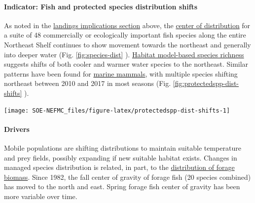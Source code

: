 \documentclass[
  10pt,
]{article}
\let\origfigure\figure
\let\endorigfigure\endfigure
\renewenvironment{figure}[1][2] {
    \expandafter\origfigure\expandafter[H]
} {
    \endorigfigure
}
\begin{document}
\hypertarget{indicator-fish-and-protected-species-distribution-shifts}{%
\paragraph{Indicator: Fish and protected species distribution shifts}\label{indicator-fish-and-protected-species-distribution-shifts}}

As noted in the \protect\hyperlink{implications}{landings implications section} above, the \href{https://noaa-edab.github.io/catalog/species_dist.html}{center of distribution} for a suite of 48 commercially or ecologically important fish species along the entire Northeast Shelf continues to show movement towards the northeast and generally into deeper water (Fig. \ref{fig:species-dist} ). \href{https://noaa-edab.github.io/catalog/habitat_diversity.html}{Habitat model-based species richness} suggests shifts of both cooler and warmer water species to the northeast. Similar patterns have been found for \href{https://noaa-edab.github.io/catalog/HMS_species_distribution.html}{marine mammals}, with multiple species shifting northeast between 2010 and 2017 in most seasons (Fig. \ref{fig:protectedspp-dist-shifts} ).

\begin{figure}

{\centering \texttt{[image: SOE-NEFMC\_files/figure-latex/protectedspp-dist-shifts-1]} 

}

\caption{Direction and magnitude of core habitat shifts, represented by the length of the line of the seasonal weighted centroid for species with more than 70 km difference between 2010 and 2017 (tip of arrow).}\label{fig:protectedspp-dist-shifts}
\end{figure}

\hypertarget{drivers}{%
\paragraph{Drivers}\label{drivers}}

Mobile populations are shifting distributions to maintain suitable temperature and prey fields, possibly expanding if new suitable habitat exists. Changes in managed species distribution is related, in part, to the \href{https://noaa-edab.github.io/catalog/forage_index.html}{distribution of forage biomass}. Since 1982, the fall center of gravity of forage fish (20 species combined) has moved to the north and east. Spring forage fish center of gravity has been more variable over time.
\end{document}
